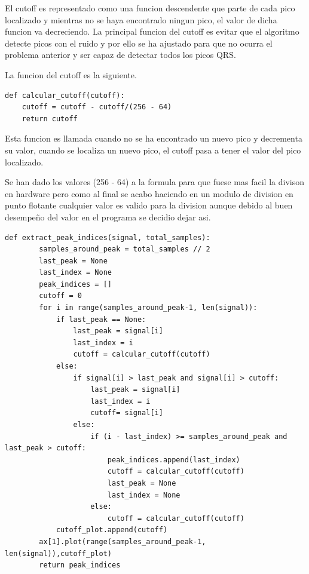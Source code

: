 El cutoff es representado como una funcion descendente que parte de cada pico localizado y mientras no se haya
encontrado ningun pico, el valor de dicha funcion va decreciendo. La principal funcion del cutoff es evitar que
el algoritmo detecte picos con el ruido y por ello se ha ajustado para que no ocurra el problema anterior y 
ser capaz de detectar todos los picos QRS.

La funcion del cutoff es la siguiente.
\lstset{language=python, breaklines=true, basicstyle=\footnotesize}
\begin{lstlisting}[frame=single]
def calcular_cutoff(cutoff):
    cutoff = cutoff - cutoff/(256 - 64)
    return cutoff
\end{lstlisting}

Esta funcion es llamada cuando no se ha encontrado un nuevo pico y decrementa su valor, cuando se localiza un
nuevo pico, el cutoff pasa a tener el valor del pico localizado.

Se han dado los valores (256 - 64) a la formula para que fuese mas facil la divison en hardware pero como al final 
se acabo haciendo en un modulo de division en punto flotante cualquier valor es valido para la division aunque debido 
al buen desempeño del valor en el programa se decidio dejar asi.

\lstset{language=python, breaklines=true, basicstyle=\footnotesize}
\begin{lstlisting}[frame=single]
    def extract_peak_indices(signal, total_samples):
        samples_around_peak = total_samples // 2
        last_peak = None
        last_index = None
        peak_indices = []
        cutoff = 0
        for i in range(samples_around_peak-1, len(signal)):
            if last_peak == None:
                last_peak = signal[i]
                last_index = i
                cutoff = calcular_cutoff(cutoff)
            else:
                if signal[i] > last_peak and signal[i] > cutoff:
                    last_peak = signal[i]
                    last_index = i
                    cutoff= signal[i]
                else:
                    if (i - last_index) >= samples_around_peak and last_peak > cutoff:
                        peak_indices.append(last_index)
                        cutoff = calcular_cutoff(cutoff)
                        last_peak = None
                        last_index = None         
                    else:
                        cutoff = calcular_cutoff(cutoff)
            cutoff_plot.append(cutoff)
        ax[1].plot(range(samples_around_peak-1, len(signal)),cutoff_plot)
        return peak_indices
\end{lstlisting}

